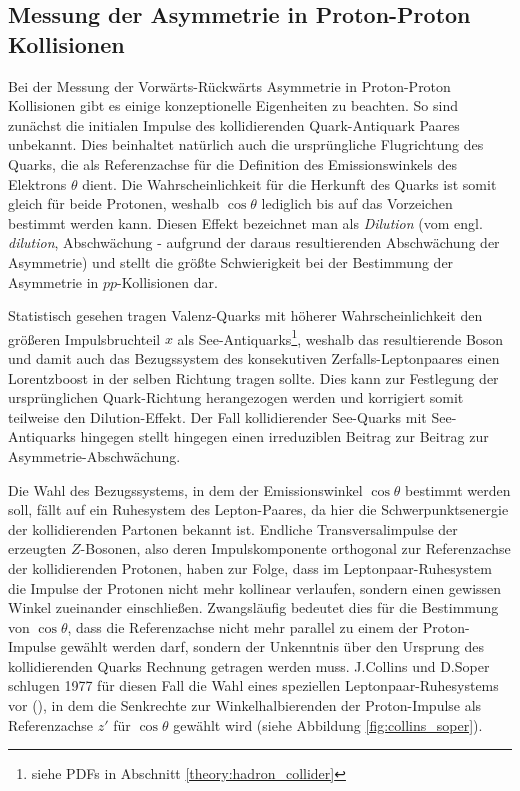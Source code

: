 \subsection{Messung der Asymmetrie in Proton-Proton Kollisionen}
\label{theory:afb_hadron_collider}

Bei der Messung der Vorwärts-Rückwärts Asymmetrie in Proton-Proton Kollisionen
gibt es einige konzeptionelle Eigenheiten zu beachten. So sind zunächst die
initialen Impulse des kollidierenden Quark-Antiquark Paares unbekannt. Dies
beinhaltet natürlich auch die ursprüngliche Flugrichtung des Quarks, die als
Referenzachse für die Definition des Emissionswinkels des Elektrons $\theta$
dient. Die Wahrscheinlichkeit für die Herkunft des Quarks ist somit gleich für
beide Protonen, weshalb $\cos\theta$ lediglich bis auf das Vorzeichen bestimmt
werden kann. Diesen Effekt bezeichnet man als \textit{Dilution} (vom engl.
\textit{dilution}, Abschwächung - aufgrund der daraus resultierenden
Abschwächung der Asymmetrie) und stellt die größte Schwierigkeit bei der
Bestimmung der Asymmetrie in $pp$-Kollisionen dar.

Statistisch gesehen tragen Valenz-Quarks mit höherer Wahrscheinlichkeit den
größeren Impulsbruchteil $x$ als See-Antiquarks\footnote{siehe \acl{PDF}s in
Abschnitt \ref{theory:hadron_collider}}, weshalb das resultierende Boson und
damit auch das Bezugssystem des konsekutiven Zerfalls-Leptonpaares einen
Lorentzboost in der selben Richtung tragen sollte. Dies kann zur Festlegung der
ursprünglichen Quark-Richtung herangezogen werden und korrigiert somit
teilweise den Dilution-Effekt. Der Fall kollidierender See-Quarks mit
See-Antiquarks hingegen stellt hingegen einen irreduziblen Beitrag zur Beitrag
zur Asymmetrie-Abschwächung.

Die Wahl des Bezugssystems, in dem der Emissionswinkel $\cos\theta$ bestimmt
werden soll, fällt auf ein Ruhesystem des Lepton-Paares, da hier die
Schwerpunktsenergie der kollidierenden Partonen bekannt ist. Endliche
Transversalimpulse der erzeugten $Z$-Bosonen, also deren Impulskomponente
orthogonal zur Referenzachse der kollidierenden Protonen, haben zur Folge, dass
im Leptonpaar-Ruhesystem die Impulse der Protonen nicht mehr kollinear
verlaufen, sondern einen gewissen Winkel zueinander einschließen. Zwangsläufig
bedeutet dies für die Bestimmung von $\cos\theta$, dass die Referenzachse nicht
mehr parallel zu einem der Proton-Impulse gewählt werden darf, sondern der
Unkenntnis über den Ursprung des kollidierenden Quarks Rechnung getragen werden
muss. J.Collins und D.Soper schlugen 1977 für diesen Fall die Wahl eines
speziellen Leptonpaar-Ruhesystems vor (\cite{Collins:1977iv}), in dem die
Senkrechte zur Winkelhalbierenden der Proton-Impulse als Referenzachse $z'$ für
$\cos\theta$ gewählt wird (siehe Abbildung \ref{fig:collins_soper}).

